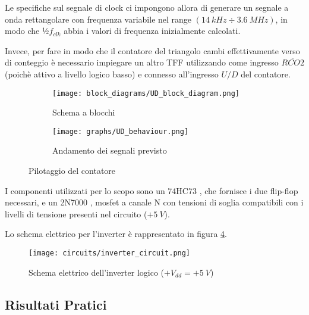 Le specifiche sul segnale di clock ci impongono allora di generare un segnale a onda rettangolare
con frequenza variabile nel range $(14\ kHz\div3.6\ MHz)$, in modo che ½$f_{clk}$ abbia
i valori di frequenza inizialmente calcolati.

Invece, per fare in modo che il contatore del triangolo cambi effettivamente verso di conteggio
è necessario impiegare un altro TFF utilizzando come ingresso $\overline{RCO2}$ (poichè
attivo a livello logico basso) e connesso all'ingresso $U/D$ del contatore.

\begin{figure}[H]
    \centering

    \begin{subfigure}{.5\textwidth}
        \centering
        \texttt{[image: block\_diagrams/UD\_block\_diagram.png]}
        \caption{Schema a blocchi}
        \label{UD_block_diagram}
    \end{subfigure}%
    \begin{subfigure}{.5\textwidth}
        \centering
        \texttt{[image: graphs/UD\_behaviour.png]}
        \caption{Andamento dei segnali previsto}
        \label{UD_behaviour}
    \end{subfigure}

    \caption{Pilotaggio del contatore}
\end{figure}

I componenti utilizzati per lo scopo sono un 74HC73 \cite{74hc73}, che fornisce i due
flip-flop necessari, e un 2N7000 \cite{2n7000}, mosfet a canale N con tensioni di soglia
compatibili con i livelli di tensione presenti nel circuito ($+5\ V$).

Lo schema elettrico per l'inverter è rappresentato in figura \ref{inverter_circuit}.

\begin{figure}[H]
    \centering
    \texttt{[image: circuits/inverter\_circuit.png]}
    \caption{Schema elettrico dell'inverter logico ($+V_{dd}=+5\ V$)}
    \label{inverter_circuit}
\end{figure}


\subsection*{Risultati Pratici}


